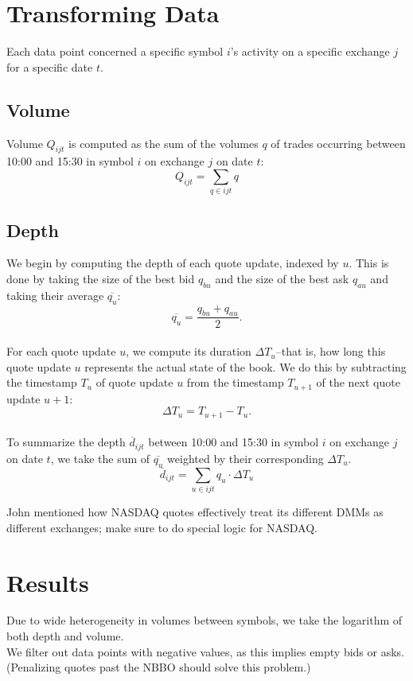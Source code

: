 \documentclass{article}
\begin{document}
\section{Transforming Data}
Each data point concerned a specific symbol $i$'s activity on a specific exchange $j$ for a specific date $t$.

\subsection{Volume}
Volume $Q_{ijt}$ is computed as the sum of the volumes $q$ of trades occurring between 10:00 and 15:30 in symbol $i$ on exchange $j$ on date $t$:\\
$$Q_{ijt} = \sum_{q \in ijt} q$$

\subsection{Depth}
We begin by computing the depth of each quote update, indexed by $u$. This is done by taking the size of the best bid $q_{bu}$ and the size of the best ask $q_{au}$ and taking their average $\overline{q_u}$:\\
$$\overline{q_u} = \frac{q_{bu} + q_{au}}{2}.$$\\
For each quote update $u$, we compute its duration $\Delta T_u$--that is, how long this quote update $u$ represents the actual state of the book. We do this by subtracting the timestamp $T_u$ of quote update $u$ from the timestamp $T_{u+1}$ of the next quote update $u+1$:\\
$$\Delta T_u = T_{u+1} - T_u.$$\\
To summarize the depth $\overline{d}_{ijt}$ between 10:00 and 15:30 in symbol $i$ on exchange $j$ on date $t$, we take the sum of $\overline{q_u}$ weighted by their corresponding $\Delta T_u$.\\
$$\overline{d}_{ijt} = \sum_{u \in ijt} q_u \cdot\Delta T_u$$

John mentioned how NASDAQ quotes effectively treat its different DMMs as different exchanges; make sure to do special logic for NASDAQ.

\section{Results}
Due to wide heterogeneity in volumes between symbols, we take the logarithm of both depth and volume.\\

We filter out data points with negative values, as this implies empty bids or asks. (Penalizing quotes past the NBBO should solve this problem.)\\
\end{document}
